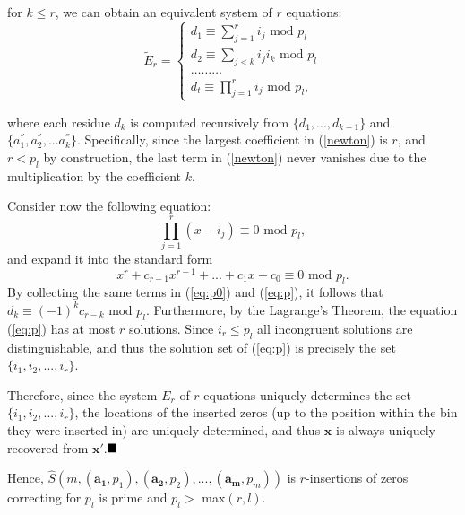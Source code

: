 for $k \leq r$, we can obtain an equivalent system of $r$ equations:
\begin{equation}
\widetilde{E}_r=\left\{
\begin{array}{ll}
d_1 \equiv \sum_{j=1}^r i_j \text{ mod }p_l\\
d_2 \equiv \sum_{j<k} i_j i_k\text{ mod }p_l\\
\dots \dots \dots \\
d_t \equiv \prod_{j=1}^r i_j \text{ mod }p_l,
\end{array} \right.
\end{equation}

where each residue $d_k$ is computed recursively from
$\{d_1,...,d_{k-1}\}$ and $\{a_1^{''},a_2^{''},...a_k^{''}\}$.
Specifically, since the largest coefficient in (\ref{newton}) is
$r$, and $r<p_l$ by construction, the last term in (\ref{newton})
never vanishes due to the multiplication by the coefficient $k$.

Consider now the following equation:
\begin{equation}\label{eq:p0} \prod_{j=1}^r(x-i_j)\equiv 0 \text{ mod } p_l,
\end{equation}
and expand it into the standard form
\begin{equation}\label{eq:p}
x^r+c_{r-1}x^{r-1}+...+c_1x+c_0 \equiv 0 \text{ mod } p_l.
\end{equation}
By collecting the same terms in (\ref{eq:p0}) and (\ref{eq:p}), it
follows that $d_k \equiv (-1)^kc_{r-k} \text{ mod } p_l$.
Furthermore, by the Lagrange's Theorem, the equation (\ref{eq:p})
has at most $r$ solutions. Since $i_r \leq p_l$ all incongruent
solutions are distinguishable, and thus the solution set of
(\ref{eq:p}) is precisely the set $\{i_1,i_2,...,i_r\}$.

Therefore, since the system $E_r$ of $r$ equations uniquely
determines the set $\{i_1,i_2,...,i_r\}$, the locations of the
inserted zeros (up to the position within the bin they were inserted
in) are uniquely determined, and thus $\mathbf{x}$ is always
uniquely recovered from $\mathbf{x'}$.$\hfill\blacksquare$

Hence,
$\hat{S}\left(m,(\mathbf{a_1},p_1),(\mathbf{a_2},p_2),...,(\mathbf{a_m},p_m)\right)$
is $r$-insertions of zeros correcting for $p_l$ is prime and $p_l
>$ max$(r,l)$.

